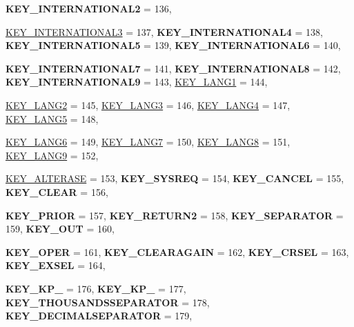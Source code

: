 \begin{DoxyCompactItemize}
{\bfseries KEY\_\-INTERNATIONAL2} =  136, 
\par
\hyperlink{classphys_1_1MetaCode_a3e501cbb5bf0f6f1fdb7211465bda8d8a1dce5180d021f3ef331d8c2ed6fd164c}{KEY\_\-INTERNATIONAL3} =  137, 
{\bfseries KEY\_\-INTERNATIONAL4} =  138, 
{\bfseries KEY\_\-INTERNATIONAL5} =  139, 
{\bfseries KEY\_\-INTERNATIONAL6} =  140, 
\par
{\bfseries KEY\_\-INTERNATIONAL7} =  141, 
{\bfseries KEY\_\-INTERNATIONAL8} =  142, 
{\bfseries KEY\_\-INTERNATIONAL9} =  143, 
\hyperlink{classphys_1_1MetaCode_a3e501cbb5bf0f6f1fdb7211465bda8d8a1df9a42e248457bd4d1db9a71e2a3373}{KEY\_\-LANG1} =  144, 
\par
\hyperlink{classphys_1_1MetaCode_a3e501cbb5bf0f6f1fdb7211465bda8d8ae506391384523e15a1a046f8d180b628}{KEY\_\-LANG2} =  145, 
\hyperlink{classphys_1_1MetaCode_a3e501cbb5bf0f6f1fdb7211465bda8d8a61885d98887d71cb6efeace8e2a635b8}{KEY\_\-LANG3} =  146, 
\hyperlink{classphys_1_1MetaCode_a3e501cbb5bf0f6f1fdb7211465bda8d8a97d692fa1be298b30c6e338020eca59c}{KEY\_\-LANG4} =  147, 
\hyperlink{classphys_1_1MetaCode_a3e501cbb5bf0f6f1fdb7211465bda8d8a2cc895ea487f902ad676c0ae358ce38f}{KEY\_\-LANG5} =  148, 
\par
\hyperlink{classphys_1_1MetaCode_a3e501cbb5bf0f6f1fdb7211465bda8d8a379a876207b4223398f3f89629ccd8fd}{KEY\_\-LANG6} =  149, 
\hyperlink{classphys_1_1MetaCode_a3e501cbb5bf0f6f1fdb7211465bda8d8a7c94e225ee1f3b6e3518a455070c78f8}{KEY\_\-LANG7} =  150, 
\hyperlink{classphys_1_1MetaCode_a3e501cbb5bf0f6f1fdb7211465bda8d8a750888e8ab0ea97e8daa1dabe90cd3e4}{KEY\_\-LANG8} =  151, 
\hyperlink{classphys_1_1MetaCode_a3e501cbb5bf0f6f1fdb7211465bda8d8a64d57026c86f63ddd54c3d08a72cde01}{KEY\_\-LANG9} =  152, 
\par
\hyperlink{classphys_1_1MetaCode_a3e501cbb5bf0f6f1fdb7211465bda8d8a49842de0ed4c70353663e255b327284b}{KEY\_\-ALTERASE} =  153, 
{\bfseries KEY\_\-SYSREQ} =  154, 
{\bfseries KEY\_\-CANCEL} =  155, 
{\bfseries KEY\_\-CLEAR} =  156, 
\par
{\bfseries KEY\_\-PRIOR} =  157, 
{\bfseries KEY\_\-RETURN2} =  158, 
{\bfseries KEY\_\-SEPARATOR} =  159, 
{\bfseries KEY\_\-OUT} =  160, 
\par
{\bfseries KEY\_\-OPER} =  161, 
{\bfseries KEY\_\-CLEARAGAIN} =  162, 
{\bfseries KEY\_\-CRSEL} =  163, 
{\bfseries KEY\_\-EXSEL} =  164, 
\par
{\bfseries KEY\_\-KP\_} =  176, 
{\bfseries KEY\_\-KP\_} =  177, 
{\bfseries KEY\_\-THOUSANDSSEPARATOR} =  178, 
{\bfseries KEY\_\-DECIMALSEPARATOR} =  179, 
\par

\end{DoxyCompactItemize}
